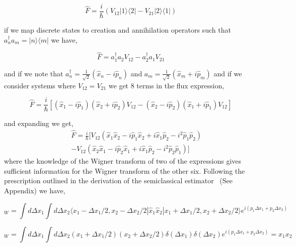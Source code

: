 \documentclass[phd,tocprelim]{cornell}
\begin{document}
\begin{equation}
\hat{F} = \frac{i}{\hbar}(V_{12} |1\rangle \langle 2|-V_{21}|2\rangle \langle 1|)
\end{equation}

if we map discrete states to creation and annihilation operators such that $a^{\dagger}_n a_m=  |n\rangle \langle m|$ we have,

\begin{equation}
\hat{F} =a^{\dagger}_1 a_2 V_{12} - a^{\dagger}_2 a_1 V_{21}
\end{equation}

and if we note that $a^{\dagger}_n= \frac{1}{\sqrt{2}}(\hat{x}_n- i\hat{p}_n)$ and $a_m= \frac{1}{\sqrt{2}}(\hat{x}_m+ i\hat{p}_m)$ and if we consider systems where $V_{12}=V_{21}$ we get 8 terms in the flux expression,

\begin{equation}
\hat{F} = \frac{i}{\hbar}[(\hat{x}_1- i\hat{p}_1)(\hat{x}_2+ i\hat{p}_2)V_{12} - (\hat{x}_2- i\hat{p}_2)(\hat{x}_1+ i\hat{p}_1)V_{12}] 
\end{equation}

and expanding we get, 
\begin{eqnarray}
&&\hat{F} = \frac{i}{\hbar}[V_{12}(\hat{x}_1\hat{x}_2-i\hat{p}_1\hat{x}_2+i\hat{x}_1\hat{p}_2-i^2\hat{p}_1\hat{p}_2)
\\
\nonumber
&&-
V_{12}(\hat{x}_2\hat{x}_1-i\hat{p}_2\hat{x}_1+i\hat{x}_1\hat{p}_2-i^2\hat{p}_2\hat{p}_1)]
\end{eqnarray}
where the knowledge of the Wigner transform of two of the expressions gives sufficient information for the Wigner transform of the other six. Following the prescription outlined in the derivation of the semiclassical estimator~\cite{hel16} (See Appendix) we have,

\begin{equation}
[\hat{x}_1\hat{x}_2]_W=\int d \Delta x_1 \int d \Delta x_2 \langle {x}_1-\Delta {x}_{1}/{2},{x}_2-\Delta {x}_{2}/{2} | \hat{x}_1\hat{x}_2| {x}_1+\Delta {x}_{1}/{2},{x}_2+\Delta {x}_{2}/{2} \rangle e^{i(p_1\Delta x_1+p_2\Delta x_2)}
\end{equation}



\begin{equation}
[\hat{x}_1\hat{x}_2]_W=\int d \Delta x_1 \int d \Delta x_2 (x_1 +\Delta x_1/2) (x_2 +\Delta x_2/2)\delta (\Delta x_1) \delta (\Delta x_2) e^{i(p_1\Delta x_1+p_2\Delta x_2)}= x_1 x_2
\end{equation}
\end{document}
